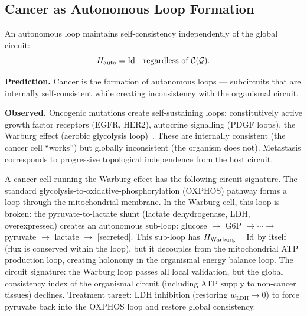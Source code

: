 \subsection{Cancer as Autonomous Loop Formation}

\begin{definition}
\label{def:autonomous-loop}
An autonomous loop maintains self-consistency independently of the global
circuit:
\begin{equation}
  H_{\mathrm{auto}} = \mathrm{Id}
  \quad \text{regardless of } \mathcal{C}(\mathcal{G}).
\end{equation}
\end{definition}

\textbf{Prediction.}  Cancer is the formation of autonomous loops ---
subcircuits that are internally self-consistent while creating inconsistency
with the organismal circuit.

\textbf{Observed.}  Oncogenic mutations create self-sustaining loops:
constitutively active growth factor receptors (EGFR, HER2), autocrine
signalling (PDGF loops), the Warburg effect (aerobic glycolysis
loop)~\citep{hanahan2011}.  These are internally consistent (the cancer
cell ``works'') but globally inconsistent (the organism does not).
Metastasis corresponds to progressive topological independence from the
host circuit.

\begin{example}
\label{ex:cancer}
A cancer cell running the Warburg effect has the following circuit
signature.  The standard glycolysis-to-oxidative-phosphorylation (OXPHOS)
pathway forms a loop through the mitochondrial membrane.  In the Warburg
cell, this loop is broken: the pyruvate-to-lactate shunt (lactate
dehydrogenase, LDH, overexpressed) creates an autonomous sub-loop:
glucose $\to$ G6P $\to \cdots \to$ pyruvate $\to$ lactate $\to$ [secreted].
This sub-loop has $H_{\mathrm{Warburg}} = \mathrm{Id}$ by itself
(flux is conserved within the loop), but it decouples from the
mitochondrial ATP production loop, creating holonomy in the organismal
energy balance loop.  The circuit signature: the Warburg loop passes all
local validation, but the global consistency index of the organismal
circuit (including ATP supply to non-cancer tissues) declines.  Treatment
target: LDH inhibition (restoring $w_{\mathrm{LDH}} \to 0$) to force
pyruvate back into the OXPHOS loop and restore global consistency.
\end{example}


